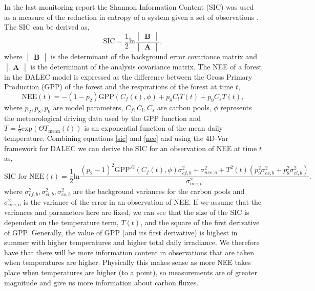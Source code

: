 \documentclass[11pt]{article}
\begin{document}
In the last monitoring report the Shannon Information Content (SIC) was used as a measure of the reduction in entropy of a system given a set of observations \cite{stewart2008correlated}. The SIC can be derived as,
\begin{equation} \label{sic}
\text{SIC}=\frac{1}{2}\text{ln}\frac{\begin{vmatrix} \textbf{B} \end{vmatrix}}{\begin{vmatrix} \textbf{A} \end{vmatrix}},
\end{equation}
where $\begin{vmatrix} \textbf{B} \end{vmatrix}$ is the determinant of the background error covariance matrix and $\begin{vmatrix} \textbf{A} \end{vmatrix}$ is the determinant of the analysis covariance matrix. The NEE of a forest in the DALEC model is expressed as the difference between the Gross Primary Production (GPP) of the forest and the respirations of the forest at time $t$,
\begin{equation} \label{nee}
\text{NEE}(t)=-(1-p_2)\text{GPP}(C_f(t),\phi)+p_8C_lT(t)+p_9C_sT(t),
\end{equation}
where $p_2, p_8, p_9$ are model parameters, $C_f, C_l, C_s$ are carbon pools, $\phi$ represents the meteorological driving data used by the GPP function and $T=\frac{1}{2}\text{exp}(\Theta T_{\text{mean}}(t))$ is an exponential function of the mean daily temperature. Combining equations \eqref{sic} and \eqref{nee} and using the 4D-Var framework for DALEC we can derive the SIC for an observation of NEE at time $t$ as,
\begin{equation}
\text{SIC for NEE}(t)=\frac{1}{2}\text{ln}\frac{(p_{2}-1)^{2}\text{GPP}'^{2}(C_f(t), \phi)\sigma_{cf,b}^{2}+\sigma_{nee,o}^{2}+T^2(t)(p_{9}^2\sigma_{cs,b}^2+p_8^2\sigma_{cl,b}^2)}{\sigma_{nee,o}^{2}}.
\end{equation}
where $\sigma_{cf,b}^{2}, \sigma_{cl,b}^2, \sigma_{cs,b}^2$ are the background variances for the carbon pools and $\sigma_{nee,o}^{2}$ is the variance of the error in an observation of NEE. If we assume that the variances and parameters here are fixed, we can see that the size of the SIC is dependent on the temperature term, $T(t)$, and the square of the first derivative of GPP. Generally, the value of GPP (and its first derivative) is highest in summer with higher temperatures and higher total daily irradiance. We therefore have that there will be more information content in observations that are taken when temperatures are higher. Physically this makes sense as more NEE takes place when temperatures are higher (to a point), so measurements are of greater magnitude and give us more information about carbon fluxes. 
\end{document}
